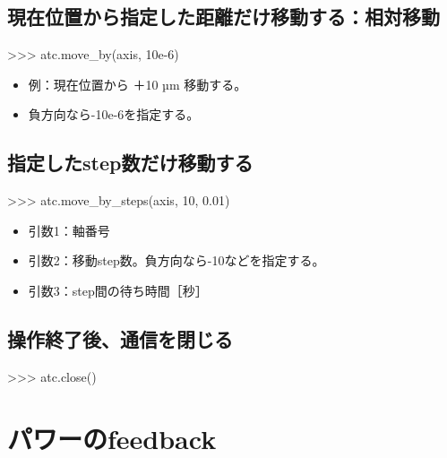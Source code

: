 \documentclass[a4paper,11pt]{ltjsarticle}
\begin{document}
\subsection{現在位置から指定した距離だけ移動する：相対移動}

\begin{command}

>>> atc.move_by(axis, 10e-6)

\end{command}

\begin{itemize}

\item 例：現在位置から ＋10 µm 移動する。

\item 負方向なら-10e-6を指定する。

\end{itemize}

\subsection{指定したstep数だけ移動する}

\begin{command}

>>> atc.move_by_steps(axis, 10, 0.01)

\end{command}

\begin{itemize}

\item 引数1：軸番号

\item 引数2：移動step数。負方向なら-10などを指定する。

\item 引数3：step間の待ち時間［秒］

\end{itemize}

\subsection{操作終了後、通信を閉じる}

\begin{command}

>>> atc.close()

\end{command}

\section{パワーのfeedback}
\end{document}

